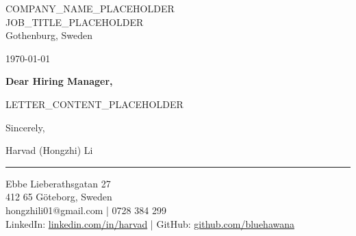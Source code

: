 \documentclass[a4paper,10pt]{article}
\begin{document}
\pagestyle{empty} %

{\color{linkedinblue}
COMPANY_NAME_PLACEHOLDER\\
JOB_TITLE_PLACEHOLDER\\
Gothenburg, Sweden}

\vspace{14pt}

\today

\vspace{16pt}

\textbf{Dear Hiring Manager,}

\vspace{8pt}

LETTER_CONTENT_PLACEHOLDER

\vspace{10pt}

Sincerely,

\vspace{15pt}

Harvad (Hongzhi) Li

\vspace{20pt}

{\color{linkedinblue}\rule{\linewidth}{0.6pt}}

\vspace{4pt}

{\color{linkedinblue}
Ebbe Lieberathsgatan 27\\
412 65 Göteborg, Sweden\\
hongzhili01@gmail.com | 0728 384 299\\
LinkedIn: \href{https://www.linkedin.com/in/harvad/}{linkedin.com/in/harvad} | GitHub: \href{https://github.com/bluehawana}{github.com/bluehawana}}
\end{document}
